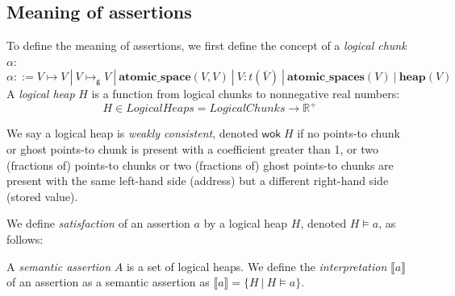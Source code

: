 \documentclass{article}
\begin{document}
\subsection{Meaning of assertions}

To define the meaning of assertions, we first define the concept of a \emph{logical chunk} $\alpha$:
$$\alpha ::= V \mapsto V\ |\ V \mapsto_\mathsf{g} V\ |\ \mathbf{atomic\_space}(V, V)\ |\ V : t(\overline{V})\ |\ \mathbf{atomic\_spaces}(V)\ |\ \mathbf{heap}(V)$$
A \emph{logical heap} $H$ is a function from logical chunks to nonnegative real numbers:
$$H \in \mathit{LogicalHeaps} = \mathit{LogicalChunks} \rightarrow \mathbb{R}^+$$

We say a logical heap is \emph{weakly consistent}, denoted $\mathsf{wok}\;H$ if no points-to chunk or ghost points-to chunk is present with a coefficient greater than 1, or two (fractions of) points-to chunks or two (fractions of) ghost points-to chunks are present with the same left-hand side (address) but a different right-hand side (stored value).

We define \emph{satisfaction} of an assertion $a$ by a logical heap $H$, denoted $H \vDash a$, as follows:

A \emph{semantic assertion} $A$ is a set of logical heaps. We define the \emph{interpretation} $\llbracket a\rrbracket$ of an assertion as a semantic assertion as $\llbracket a\rrbracket = \{H\ |\ H\vDash a\}$.
\end{document}
